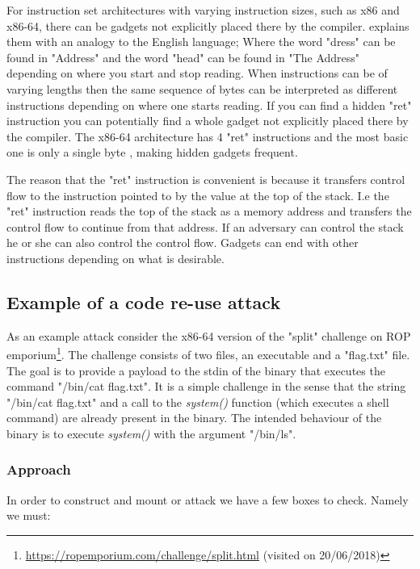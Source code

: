 For instruction set architectures with varying instruction sizes, such as x86 and x86-64,
there can be gadgets not explicitly placed there by the compiler. \textcite{rop} explains
them with an analogy to the English language; Where the word "dress" can be found in
"Address" and the word "head" can be found in "The Address" depending on where you start
and stop reading. When instructions can be of varying lengths then the same sequence of
bytes can be interpreted as different instructions depending on where one starts reading.
If you can find a hidden "ret" instruction you can potentially find a whole gadget not
explicitly placed there by the compiler. The x86-64 architecture has 4 "ret" instructions
and the most basic one is only a single byte \cite{x86-ret}, making hidden gadgets frequent.

The reason that the "ret" instruction is convenient is because it transfers control flow
to the instruction pointed to by the value at the top of the stack. I.e the "ret" instruction
reads the top of the stack as a memory address and transfers the control flow to continue
from that address. If an adversary can control the stack he or she can also control the
control flow. Gadgets can end with other instructions depending on what is desirable.

\subsection{Example of a code re-use attack}

As an example attack consider the x86-64 version of the "split" challenge on ROP emporium\footnote{\url{https://ropemporium.com/challenge/split.html} (visited on 20/06/2018)}.
The challenge consists of two files, an executable and a "flag.txt" file. The goal is to
provide a payload to the stdin of the binary that executes the command "/bin/cat flag.txt".
It is a simple challenge in the sense that the string "/bin/cat flag.txt" and a call to
the \textit{system()} function (which executes a shell command) are already present in the
binary. The intended behaviour of the binary is to execute \textit{system()} with the
argument "/bin/ls".

\subsubsection{Approach}

In order to construct and mount or attack we have a few boxes to check. Namely we must:

